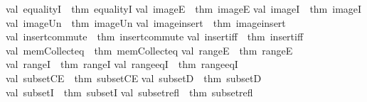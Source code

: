 \begin{isabellebody}
val\ equalityI\ {\isacharequal}{\kern0pt}\ {\isacharat}{\kern0pt}{\isacharbraceleft}{\kern0pt}thm\ equalityI{\isacharbraceright}{\kern0pt}\isanewline
val\ imageE\ {\isacharequal}{\kern0pt}\ {\isacharat}{\kern0pt}{\isacharbraceleft}{\kern0pt}thm\ imageE{\isacharbraceright}{\kern0pt}\isanewline
val\ imageI\ {\isacharequal}{\kern0pt}\ {\isacharat}{\kern0pt}{\isacharbraceleft}{\kern0pt}thm\ imageI{\isacharbraceright}{\kern0pt}\isanewline
val\ image{\isacharunderscore}{\kern0pt}Un\ {\isacharequal}{\kern0pt}\ {\isacharat}{\kern0pt}{\isacharbraceleft}{\kern0pt}thm\ image{\isacharunderscore}{\kern0pt}Un{\isacharbraceright}{\kern0pt}\isanewline
val\ image{\isacharunderscore}{\kern0pt}insert\ {\isacharequal}{\kern0pt}\ {\isacharat}{\kern0pt}{\isacharbraceleft}{\kern0pt}thm\ image{\isacharunderscore}{\kern0pt}insert{\isacharbraceright}{\kern0pt}\isanewline
val\ insert{\isacharunderscore}{\kern0pt}commute\ {\isacharequal}{\kern0pt}\ {\isacharat}{\kern0pt}{\isacharbraceleft}{\kern0pt}thm\ insert{\isacharunderscore}{\kern0pt}commute{\isacharbraceright}{\kern0pt}\isanewline
val\ insert{\isacharunderscore}{\kern0pt}iff\ {\isacharequal}{\kern0pt}\ {\isacharat}{\kern0pt}{\isacharbraceleft}{\kern0pt}thm\ insert{\isacharunderscore}{\kern0pt}iff{\isacharbraceright}{\kern0pt}\isanewline
val\ mem{\isacharunderscore}{\kern0pt}Collect{\isacharunderscore}{\kern0pt}eq\ {\isacharequal}{\kern0pt}\ {\isacharat}{\kern0pt}{\isacharbraceleft}{\kern0pt}thm\ mem{\isacharunderscore}{\kern0pt}Collect{\isacharunderscore}{\kern0pt}eq{\isacharbraceright}{\kern0pt}\isanewline
val\ rangeE\ {\isacharequal}{\kern0pt}\ {\isacharat}{\kern0pt}{\isacharbraceleft}{\kern0pt}thm\ rangeE{\isacharbraceright}{\kern0pt}\isanewline
val\ rangeI\ {\isacharequal}{\kern0pt}\ {\isacharat}{\kern0pt}{\isacharbraceleft}{\kern0pt}thm\ rangeI{\isacharbraceright}{\kern0pt}\isanewline
val\ range{\isacharunderscore}{\kern0pt}eqI\ {\isacharequal}{\kern0pt}\ {\isacharat}{\kern0pt}{\isacharbraceleft}{\kern0pt}thm\ range{\isacharunderscore}{\kern0pt}eqI{\isacharbraceright}{\kern0pt}\isanewline
val\ subsetCE\ {\isacharequal}{\kern0pt}\ {\isacharat}{\kern0pt}{\isacharbraceleft}{\kern0pt}thm\ subsetCE{\isacharbraceright}{\kern0pt}\isanewline
val\ subsetD\ {\isacharequal}{\kern0pt}\ {\isacharat}{\kern0pt}{\isacharbraceleft}{\kern0pt}thm\ subsetD{\isacharbraceright}{\kern0pt}\isanewline
val\ subsetI\ {\isacharequal}{\kern0pt}\ {\isacharat}{\kern0pt}{\isacharbraceleft}{\kern0pt}thm\ subsetI{\isacharbraceright}{\kern0pt}\isanewline
val\ subset{\isacharunderscore}{\kern0pt}refl\ {\isacharequal}{\kern0pt}\ {\isacharat}{\kern0pt}{\isacharbraceleft}{\kern0pt}thm\ subset{\isacharunderscore}{\kern0pt}refl{\isacharbraceright}{\kern0pt}\isanewline

\end{isabellebody}
